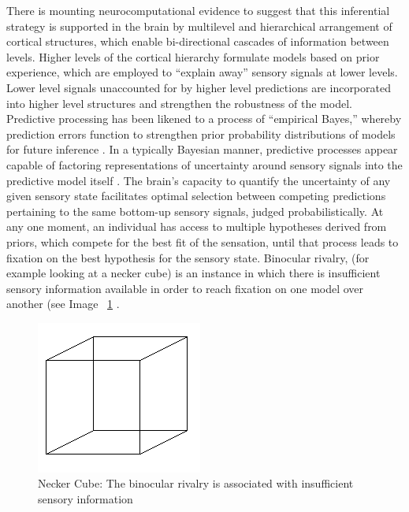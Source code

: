 \begin{CJK}{UTF8}{gbsn}
{There is mounting neurocomputational evidence to suggest that this inferential strategy is supported in the brain by multilevel and hierarchical arrangement of cortical structures, which enable bi-directional cascades of information between levels.  Higher levels of the cortical hierarchy formulate models based on prior experience, which are employed to ``explain away'' sensory signals at lower levels. Lower level signals unaccounted for by higher level predictions are incorporated into higher level structures and strengthen the robustness of the model.  Predictive processing has been likened to a process of ``empirical Bayes,'' whereby prediction errors function to strengthen prior probability distributions of models for future inference \citep{Robbins1964}.  In a typically Bayesian manner, predictive processes appear capable of factoring representations of uncertainty around sensory signals into the predictive model itself \citep{Clark2013}.  The brain's capacity to quantify the uncertainty of any given sensory state facilitates optimal selection between competing predictions pertaining to the same bottom-up sensory signals, judged probabilistically.  At any one moment, an individual has access to multiple hypotheses derived from priors, which compete for the best fit of the sensation, until that process leads to fixation on the best hypothesis for the sensory state.
Binocular rivalry, (for example looking at a necker cube) is an instance in which there is insufficient sensory information available in order to reach fixation on one model over another (see Image ~\ref{fig:neckerCube} \citep{Frith2007}.

\begin{figure}[htbp]
  \begin{center}
    \includegraphics{images/Necker_cube.png}
      \caption{Necker Cube: The binocular rivalry is associated with insufficient sensory information}
        \label{fig:neckerCube}
   \end{center}
\end{figure}

}
\end{CJK}
